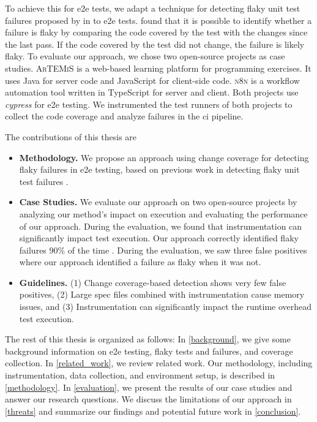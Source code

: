 To achieve this for \ac{e2e} tests, we adapt a technique for detecting flaky unit test failures proposed by \citeauthor*{bell_deflaker_2018} in  \autocite{bell_deflaker_2018} to \ac{e2e} tests.
 found that it is possible to identify whether a failure is flaky by comparing the code covered by the test with the changes since the last pass.
If the code covered by the test did not change, the failure is likely flaky.
To evaluate our approach, we chose two open-source projects as case studies.
\textsc{ArTEMiS} \autocite{krusche_artemis_2018} is a web-based learning platform for programming exercises.
It uses Java for server code and JavaScript for client-side code.
\textsc{n8n} \autocite{noauthor_n8n_2023} is a workflow automation tool written in TypeScript for server and client.
Both projects use \textit{cypress} \autocite{noauthor_cypress-iocypress_2023} for \ac{e2e} testing.
We instrumented the test runners of both projects to collect the code coverage and analyze failures in the \ac{ci} pipeline.

The contributions of this thesis are
\begin{itemize}
	\item \textbf{Methodology.} We propose an approach using change coverage for detecting flaky failures in \ac{e2e} testing, based on previous work in detecting flaky unit test failures \autocite{bell_deflaker_2018}.
	\item \textbf{Case Studies.} We evaluate our approach on two open-source projects by analyzing our method's impact on execution and evaluating the performance of our approach.
	      During the evaluation, we found that instrumentation can significantly impact test execution.
	      Our approach correctly identified flaky failures 90\% of the time .
	      During the evaluation, we saw three  false positives where our approach identified a failure as flaky when it was not.
	\item \textbf{Guidelines.} (1) Change coverage-based detection shows very few false positives,
	      (2) Large spec files combined with instrumentation cause memory issues, and
	      (3) Instrumentation can significantly impact the runtime overhead test execution.
\end{itemize}

The rest of this thesis is organized as follows:
In \cref{background}, we give some background information on \ac{e2e} testing, flaky tests and failures, and coverage collection.
In \cref{related_work}, we review related work.
Our methodology, including instrumentation, data collection, and environment setup, is described in \cref{methodology}.
In \cref{evaluation}, we present the results of our case studies and answer our research questions.
We discuss the limitations of our approach in \cref{threats} and summarize our findings and potential future work in \cref{conclusion}.



